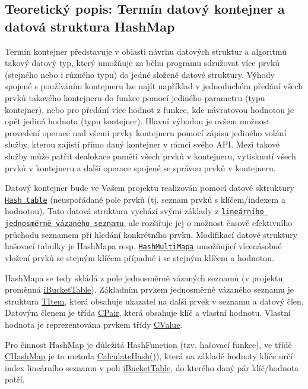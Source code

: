 \subsection*{Teoretický popis\+: Termín datový kontejner a datová struktura Hash\+Map}

Termín kontejner představuje v oblasti návrhu datových struktur a algoritmů takový datový typ, který umožňuje za běhu programu sdružovat více prvků (stejného nebo i různého typu) do jedné složené datové struktury. Výhody spojené s používáním kontejneru lze najít například v jednoduchém předání všech prvků takového kontejneru do funkce pomocí jediného parametru (typu kontejner), nebo pro předání více hodnot z funkce, kde návratovou hodnotou je opět jediná hodnota (typu kontejner). Hlavní výhodou je ovšem možnost provedení operace nad všemi prvky kontejneru pomocí zápisu jediného volání služby, kterou zajistí přímo daný kontejner v rámci svého A\+PI. Mezi takové služby může patřit dealokace paměti všech prvků v kontejneru, vytisknutí všech prvků v kontejneru a další operace spojené se správou prvků v kontejneru.

Datový kontejner bude ve Vašem projektu realizován pomocí datové sktruktury \href{https://en.wikipedia.org/wiki/Hash_table}{\tt Hash table} (neuspořádané pole prvků (tj. seznam prvků s klíčem/indexem a hodnotou). Tato datová struktura vychází svými základy z \href{https://en.wikipedia.org/wiki/Linked_list}{\tt lineárního jednosměrně vázaného seznamu}, ale rozšiřuje jej o možnost časově efektivního průchodu seznamem při hledání konkrétního prvku. Modifikací datové struktury hašovací tabulky je Hash\+Mapa resp. \href{https://en.wikipedia.org/wiki/Multimap}{\tt Hash\+Multi\+Mapa} umožňujicí vícenásobné vložení prvků se stejným klíčem případně i se stejným klíčem a hodnotou.

Hash\+Mapa se tedy skládá z pole jednosměrně vázaných seznamů (v projektu proměnná \hyperlink{class_c_hash_map_a1018fdaad71e8207e747db26e88025d6}{i\+Bucket\+Table}). Základním prvkem jednosměrně vázaného seznamu je struktura \hyperlink{struct_c_hash_map_1_1_t_item}{T\+Item}, která obsahuje ukazatel na další prvek v seznamu a datový člen. Datovým členem je třída \hyperlink{class_c_pair}{C\+Pair}, která obsahuje klíč a vlastní hodnotu. Vlastní hodnota je reprezentována prvkem třídy \hyperlink{class_c_value__bool_1_1_c_value}{C\+Value}.

Pro činnost Hash\+Map je důležitá Hash\+Function (tzv. hašovací funkce), ve třídě \hyperlink{class_c_hash_map}{C\+Hash\+Map} je to metoda \hyperlink{class_c_hash_map_ad7230ba064063608b7e49495d3660426}{Calculate\+Hash()}), která na základě hodnoty klíče určí index lineárního seznamu v poli \hyperlink{class_c_hash_map_a1018fdaad71e8207e747db26e88025d6}{i\+Bucket\+Table}, do kterého daný pár klíč/hodnota patří.

